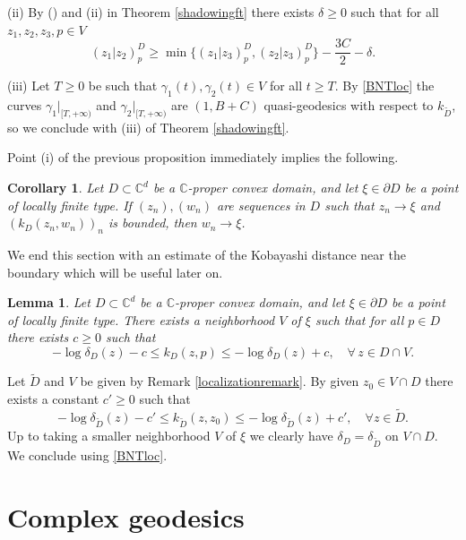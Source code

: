 \documentclass[11pt, reqno]{amsart}
\numberwithin{equation}{section}
\newtheorem{corollary}[theorem]{Corollary}
\newtheorem{lemma}[theorem]{Lemma}
\theoremstyle{definition}
\newcommand{\C}{\mathbb{C}}
\begin{document}
	
	(ii) By () and (ii) in Theorem \ref{shadowingft} there exists $\delta\geq0$ such that for all $z_1,z_2,z_3,p\in V$
	$$(z_1|z_2)^{D}_p\geq\min\{(z_1|z_3)^{D}_p,(z_2|z_3)^{D}_p\}-\frac{3C}{2}-\delta.$$
	
	
	(iii) Let $T\geq 0$ be such that  $\gamma_1(t),\gamma_2(t)\in V$ for all $t\geq T$.
	By \eqref{BNTloc} the curves  $\gamma_1|_{[T,+\infty)}$ and $\gamma_2|_{[T,+\infty)}$ are $(1,B+C)$ quasi-geodesics with respect to $k_{\tilde{D}}$, so we conclude with (iii) of Theorem \ref{shadowingft}.
	\endproof
	
	
	Point (i) of the previous proposition immediately implies the following.
	\begin{corollary}\label{convergestesso}
		Let $D\subset \C^d$ be a $\C$-proper convex domain, and let $\xi\in \partial D$ be a point of locally finite type. If $(z_n),(w_n)$ are sequences in $D$ such that $z_n\to\xi$ and $(k_D(z_n,w_n))_n$ is bounded, then $w_n\to\xi$.
	\end{corollary}
	
	
	
	
	We end this section with an estimate of the Kobayashi distance near the boundary which will be useful later on.
	\begin{lemma}\label{stimekob}
		Let $D\subset \C^d$ be a $\C$-proper convex domain, and let $\xi\in \partial D$ be a point of locally finite type.
		There exists a neighborhood $V$ of $\xi$ such that for all $p\in D$ there exists $c\geq 0$ such that
		$$-\log\delta_D(z)-c\leq k_D(z,p)\leq -\log\delta_D(z)+c, \quad \forall\,z\in D\cap V.$$
	\end{lemma}
	\proof
	Let $\tilde D$ and $V$ be given by Remark \ref{localizationremark}.
	By   \cite[Lemma 1.1, Lemma 1.3]{AbTau} given $z_0\in  V\cap D$ there exists a constant $c'\geq 0$ such that 
	$$-\log\delta_{\tilde D}(z)-c'\leq k_{\tilde D}(z,z_0)\leq -\log\delta_{\tilde D}(z)+c',\quad\forall z\in \tilde D.$$
	Up to taking a smaller neighborhood $V$ of $\xi$ we clearly have $\delta_D=\delta_{\tilde D}$ on $V\cap D$. 
	We conclude using \eqref{BNTloc}.
	\endproof
	
	\section{Complex geodesics}
	
\end{document}

